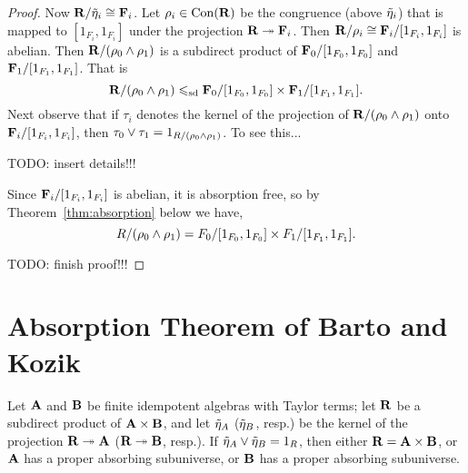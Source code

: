 \begin{proof}
Now $\mathbf{R}/\tilde{\eta}_i \cong \mathbf{F}_i$.  Let $\rho_i \in \operatorname{Con}(\mathbf{R})$ be the congruence
(above $\tilde{\eta}_i$) that is mapped to $[1_{F_i}, 1_{F_i}]$ under the projection 
$\mathbf{R} \twoheadrightarrow \mathbf{F}_i$.  Then $\mathbf{R}/\rho_i \cong \mathbf{F}_i/[1_{F_i}, 1_{F_i}]$ is abelian.
Then $\mathbf{R}/(\rho_0\wedge \rho_1)$ is a subdirect product of $\mathbf{F}_0/[1_{F_0}, 1_{F_0}]$ and 
$\mathbf{F}_1/[1_{F_1}, 1_{F_1}]$.  That is
\[
\mathbf{R}/(\rho_0\wedge \rho_1) \leqslant_{\mathrm{sd}} \mathbf{F}_0/[1_{F_0}, 1_{F_0}] \times 
\mathbf{F}_1/[1_{F_1}, 1_{F_1}].
\]
Next observe that if $\tau_i$ denotes the kernel of the projection of 
$\mathbf{R}/(\rho_0\wedge \rho_1)$ onto $\mathbf{F}_i/[1_{F_i}, 1_{F_i}]$, then 
$\tau_0\vee \tau_1 = 1_{R/(\rho_0\wedge \rho_1)}$. To see this... 

\bigskip

\noindent TODO: insert details!!!

\vfill

Since $\mathbf{F}_i/[1_{F_i}, 1_{F_i}]$ is abelian, it is absorption free, so
by Theorem~\ref{thm:absorption} below we have,
\begin{equation}
  \label{eq:101010}
R/(\rho_0\wedge \rho_1) = F_0/[1_{F_0}, 1_{F_0}] \times 
F_1/[1_{F_1}, 1_{F_1}].
\end{equation}

\bigskip

\noindent TODO: finish proof!!!

\vfill

\end{proof}

\pagebreak




\appendix

\section{Absorption Theorem of Barto and Kozik}
\begin{theorem}
\label{thm:absorption}
Let $\mathbf{A}$ and $\mathbf{B}$ be finite
idempotent algebras with Taylor terms; let $\mathbf{R}$ be a subdirect product of
$\mathbf{A} \times \mathbf{B}$, and let $\tilde{\eta}_A$ ($\tilde{\eta}_B$, resp.) be the kernel of the
projection $\mathbf{R} \twoheadrightarrow \mathbf{A}$ ($\mathbf{R} \twoheadrightarrow \mathbf{B}$, resp.).
If $\tilde{\eta}_A \vee \tilde{\eta}_B = 1_R$, then either $\mathbf{R} = \mathbf{A} \times \mathbf{B}$, or
$\mathbf{A}$ has a proper absorbing subuniverse, or $\mathbf{B}$ has a proper absorbing subuniverse.
\end{theorem}


